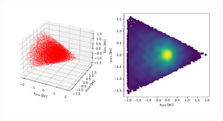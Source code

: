 \documentclass{beamer}
\begin{document}






\begin{frame}


\begin{figure}
\centering
\includegraphics[width=\linewidth]{Images/cone_3D.pdf}
\end{figure}

\end{frame}



\end{document}
